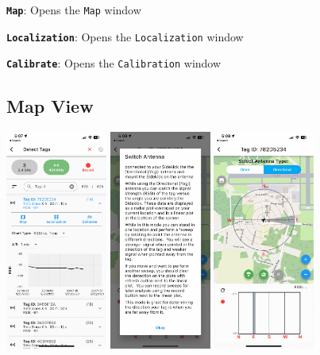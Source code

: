 \documentclass[
]{article}
\begin{document}
\textbf{\texttt{Map}}: Opens the \texttt{Map} window

\textbf{\texttt{Localization}}: Opens the \texttt{Localization} window

\textbf{\texttt{Calibrate}}: Opens the \texttt{Calibration} window

\hypertarget{map-view}{%
\subsection{Map View}\label{map-view}}

\includegraphics[width=0.25\textwidth,height=\textheight]{./images/sidekick_DetectTag.PNG}
\includegraphics[width=0.25\textwidth,height=\textheight]{./images/sidekickMap_YagiAntTip.PNG}
\includegraphics[width=0.25\textwidth,height=\textheight]{./images/sidekickMap_YagiAnt.PNG}
\end{document}
